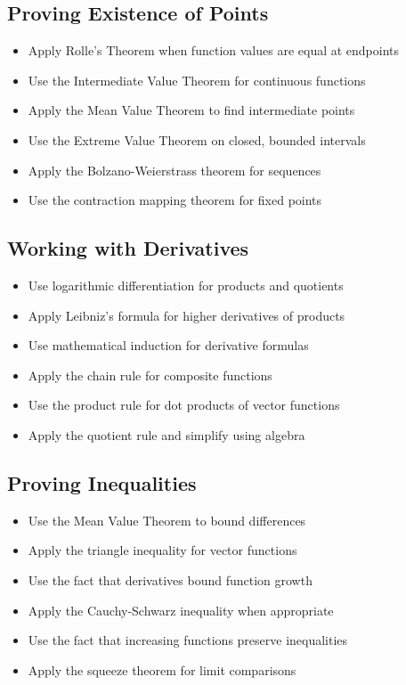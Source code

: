 \subsection*{Proving Existence of Points}
\begin{itemize}
\item Apply Rolle's Theorem when function values are equal at endpoints
\item Use the Intermediate Value Theorem for continuous functions
\item Apply the Mean Value Theorem to find intermediate points
\item Use the Extreme Value Theorem on closed, bounded intervals
\item Apply the Bolzano-Weierstrass theorem for sequences
\item Use the contraction mapping theorem for fixed points
\end{itemize}

\subsection*{Working with Derivatives}
\begin{itemize}
\item Use logarithmic differentiation for products and quotients
\item Apply Leibniz's formula for higher derivatives of products
\item Use mathematical induction for derivative formulas
\item Apply the chain rule for composite functions
\item Use the product rule for dot products of vector functions
\item Apply the quotient rule and simplify using algebra
\end{itemize}

\subsection*{Proving Inequalities}
\begin{itemize}
\item Use the Mean Value Theorem to bound differences
\item Apply the triangle inequality for vector functions
\item Use the fact that derivatives bound function growth
\item Apply the Cauchy-Schwarz inequality when appropriate
\item Use the fact that increasing functions preserve inequalities
\item Apply the squeeze theorem for limit comparisons
\end{itemize}

